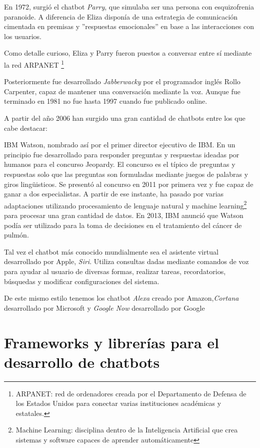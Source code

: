 En 1972, surgió el chatbot \textit{Parry}, que simulaba ser una persona con esquizofrenia paranoide. A diferencia de Eliza disponía de una estrategia de comunicación cimentada en premisas y ''respuestas emocionales'' en base a las interacciones con los usuarios. \cite{StreamGenerator}

Como detalle curioso, Eliza y Parry fueron puestos a conversar entre sí mediante la red ARPANET \footnote{ARPANET: red de ordenadores creada por el Departamento de Defensa de los Estados Unidos para conectar varias instituciones académicas y estatales.}  

Posteriormente fue desarrollado \textit{Jabberwacky} por el programador inglés Rollo Carpenter, capaz de mantener una conversación mediante la voz. Aunque fue terminado en 1981 no fue hasta 1997 cuando fue publicado online.

A partir del año 2006 han surgido una gran cantidad de chatbots entre los que cabe destacar:

IBM Watson, nombrado así por el primer director ejecutivo de IBM. En un principio fue desarrollado para responder preguntas y respuestas ideadas por humanos para el concurso Jeopardy. El concurso es el típico de preguntas y respuestas solo que las preguntas son formuladas mediante juegos de palabras y giros lingüisticos. Se presentó al concurso en 2011 por primera vez y fue capaz de ganar a dos especialistas. A partir de ese instante, ha pasado por varias adaptaciones utilizando procesamiento de lenguaje natural y machine learning\footnote{Machine Learning: disciplina dentro de la Inteligencia Artificial que crea sistemas y software capaces de aprender automáticamente} para procesar una gran cantidad de datos. En 2013, IBM anunció que Watson podía ser utilizado para la toma de decisiones en el tratamiento del cáncer de pulmón. 

Tal vez el chatbot más conocido mundialmente sea el asistente virtual desarrollado por Apple, \textit{Siri}. Utiliza consultas dadas mediante comandos de voz para ayudar al usuario de diversas formas, realizar tareas, recordatorios, búsquedas y modificar configuraciones del sistema.

De este mismo estilo tenemos los chatbot \textit{Alexa} creado por Amazon,\textit{Cortana} desarrollado por Microsoft y \textit{Google Now} desarrollado por Google


\section{Frameworks y librerías para el desarrollo de chatbots}

